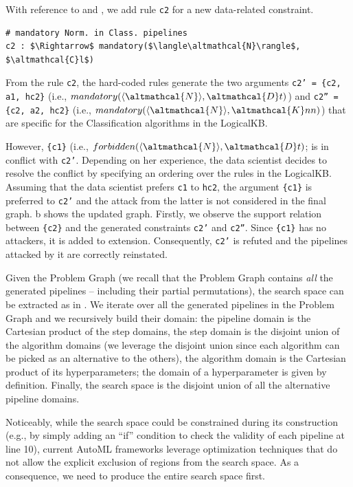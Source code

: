 \begin{example}
With reference to  and , we add rule \texttt{c2} for a new data-related constraint.
\begin{lstlisting}[mathescape=true]
# mandatory Norm. in Class. pipelines
c2 : $\Rightarrow$ mandatory($\langle\altmathcal{N}\rangle$, $\altmathcal{C}l$)
\end{lstlisting}
From the rule \texttt{c2}, the hard-coded rules generate the two arguments
\texttt{c2' = \{c2, a1, hc2\}} (i.e., $mandatory(\langle\altmathcal{N}\rangle, \altmathcal{D}t)$) and \texttt{c2'' = \{c2, a2, hc2\}} (i.e., $mandatory(\langle\altmathcal{N}\rangle, \altmathcal{K}nn)$) that are specific for the Classification algorithms in the LogicalKB.

However, \texttt{\{c1\}} (i.e., $forbidden(\langle\altmathcal{N}\rangle, \altmathcal{D}t)$; is in conflict with \texttt{c2'}.
Depending on her experience, the data scientist decides to resolve the conflict by specifying an ordering over the rules in the LogicalKB.
Assuming that the data scientist prefers \texttt{c1} to \texttt{hc2},
the argument \texttt{\{c1\}} is preferred to \texttt{c2'} and the attack from the latter is not considered in the final graph.
b shows the updated graph.
Firstly, we observe the support relation between \texttt{\{c2\}} and the generated constraints \texttt{c2'} and \texttt{c2''}.
Since \texttt{\{c1\}} has no attackers, it is added to extension.
Consequently, \texttt{c2'} is refuted and the pipelines attacked by it are correctly reinstated.
\label{ex:hard_coded_rules}
\end{example}

Given the Problem Graph (we recall that the Problem Graph contains \emph{all} the generated pipelines -- including their partial permutations), the search space can be extracted as in . 
We iterate over all the generated pipelines in the Problem Graph and we recursively build their domain: the pipeline domain is the Cartesian product of the step domains, the step domain is the disjoint union of the algorithm domains (we leverage the disjoint union since each algorithm can be picked as an alternative to the others), the algorithm domain is the Cartesian product of its hyperparameters; the domain of a hyperparameter is given by definition.
Finally, the search space is the disjoint union of all the alternative pipeline domains.

Noticeably, while the search space could be constrained during its construction (e.g., by simply adding an ``if'' condition to check the validity of each pipeline at  line 10), current AutoML frameworks leverage optimization techniques that do not allow the explicit exclusion of regions from the search space.
As a consequence, we need to produce the entire search space first.

